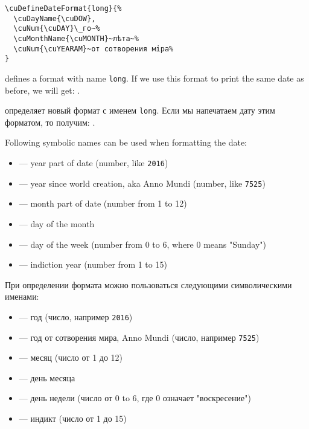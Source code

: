 \begin{verbatim}
\cuDefineDateFormat{long}{%
  \cuDayName{\cuDOW},
  \cuNum{\cuDAY}\_го~%
  \cuMonthName{\cuMONTH}~лѣта~%
  \cuNum{\cuYEARAM}~от сотворения мiра%
}
\end{verbatim}
%
%
\begin{EN}
defines a format with name \texttt{long}. If we use this format to print the same date as before, we will get:
.
\end{EN}

\begin{RU}
определяет новый формат с именем \texttt{long}. Если мы напечатаем дату этим форматом, то получим:
.
\end{RU}

\begin{EN}
Following symbolic names can be used when formatting the date:
\begin{itemize}
\item {} --- year part of date (number, like \texttt{2016})
\item {} --- year since world creation, aka Anno Mundi (number, like \texttt{7525})
\item {} --- month part of date (number from 1 to 12)
\item {} --- day of the month
\item {} --- day of the week (number from 0 to 6, where 0 means "Sunday")
\item {} --- indiction year (number from 1 to 15)
\end{itemize}
\end{EN}

\begin{RU}
При определении формата можно пользоваться следующими символическими именами:
\begin{itemize}
\item {} --- год (число, например \texttt{2016})
\item {} --- год от сотворения мира, Anno Mundi (число, например \texttt{7525})
\item {} --- месяц (число от 1 до 12)
\item {} --- день месяца
\item {} --- день недели (число от 0 to 6, где 0 означает "воскресение")
\item {} --- индикт (число от 1 до 15)
\end{itemize}
\end{RU}

